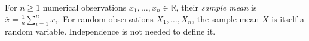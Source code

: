
For $n\ge1$ numerical observations $x_1,\ldots,x_n\in\mathbb R$, their \emph{sample mean} is $\overline{x}=\frac1n\sum_{i=1}^n x_i$. For random observations $X_1,\ldots,X_n$, the sample mean $\overline X$ is itself a random variable. Independence is not needed to define it.
